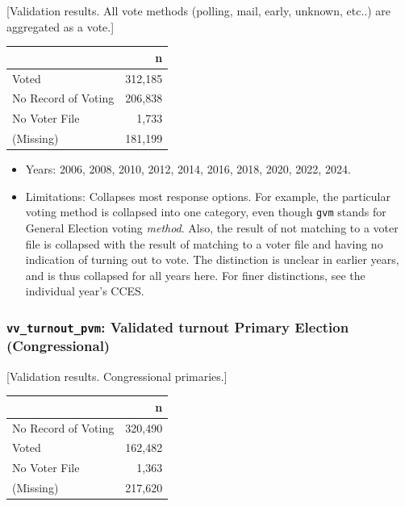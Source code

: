 \documentclass[10pt,article,oneside]{memoir}
\begin{document}
{[}Validation results. All vote methods (polling, mail, early, unknown,
etc..) are aggregated as a vote.{]}

\begin{table}[H]
\centering
\begin{tabular}[t]{lr}
\toprule
 & n\\
\midrule
Voted & 312,185\\
No Record of Voting & 206,838\\
No Voter File & 1,733\\
(Missing) & 181,199\\
\bottomrule
\end{tabular}
\end{table}

\begin{itemize}
\tightlist
\item
  Years: 2006, 2008, 2010, 2012, 2014, 2016, 2018, 2020, 2022, 2024.
\item
  Limitations: Collapses most response options. For example, the
  particular voting method is collapsed into one category, even though
  \texttt{gvm} stands for General Election voting \emph{method}. Also,
  the result of not matching to a voter file is collapsed with the
  result of matching to a voter file and having no indication of turning
  out to vote. The distinction is unclear in earlier years, and is thus
  collapsed for all years here. For finer distinctions, see the
  individual year's CCES.
\end{itemize}

\subsubsection{\texorpdfstring{\texttt{vv\_turnout\_pvm}: Validated
turnout Primary Election
(Congressional)}{vv\_turnout\_pvm: Validated turnout Primary Election (Congressional)}}\label{vv_turnout_pvm-validated-turnout-primary-election-congressional}

{[}Validation results. Congressional primaries.{]}

\begin{table}[H]
\centering
\begin{tabular}[t]{lr}
\toprule
 & n\\
\midrule
No Record of Voting & 320,490\\
Voted & 162,482\\
No Voter File & 1,363\\
(Missing) & 217,620\\
\bottomrule
\end{tabular}
\end{table}
\end{document}
